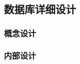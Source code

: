 \documentclass{article}
\begin{document}
\subsection{数据库详细设计}

\subsubsection{概念设计}

\subsubsection{内部设计}
\end{document}
